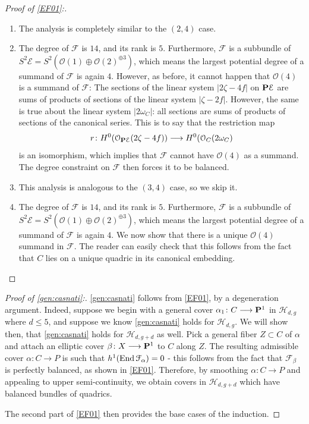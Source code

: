 \documentclass[reqno, 10 pt]{article}
\theoremstyle{definition}
\theoremstyle{remark}
\numberwithin{equation}{section}
\numberwithin{thm}{section}
\numberwithin{prop}{section}
\numberwithin{lem}{section}
\numberwithin{cor}{section}
\numberwithin{conj}{section}
\numberwithin{defn}{section}
\renewcommand{\H}{\mathcal H}
\renewcommand{\to}{\longrightarrow}
\newcommand{\cE}{{\mathcal E}}
\newcommand{\cF}{{\mathcal F}}
\newcommand{\cO}{{\mathcal O}}
\renewcommand{\P}{{\bf P}}
\newcommand {\from}{{\colon}}
\renewcommand{\H}{{\mathcal{H}}}
\newcommand {\End}{{\rm End \,}}
\begin{document}
\begin{proof}[Proof of \autoref{EF01}:]
\begin{enumerate}
\begin{enumerate}
\item[$(3,4)$:] The analysis is completely similar to the $(2,4)$ case.

\item[$(3,5)$:] The degree of $\cF$ is $14$, and its rank is $5$.  Furthermore, $\cF$ is a subbundle of $S^2 \cE = S^2 (\cO(1)  \oplus \cO(2)^{\oplus 3})$, which means the largest potential degree of a summand of $\cF$ is again $4$.  However, as before, it cannot happen that $\cO(4)$ is a summand of $\cF$: The sections of the linear system $|2\zeta - 4f|$ on $\P \cE$ are sums of products of sections of the linear system $|\zeta - 2f|$.  However, the same is true about the linear system $|2\omega_{C}|$: all sections are sums of products of sections of the canonical series.  This is to say that the restriction map \[r \from H^0(\cO_{\P \cE}(2\zeta - 4f)) \to H^{0}(\cO_{C}(2\omega_{C})\] is an isomorphism, which implies that $\cF$ cannot have $\cO(4)$ as a summand. The degree constraint on $\cF$ then forces it to be balanced.

\item[$(4,4)$:] This analysis is analogous to the $(3,4)$ case, so we skip it.

\item[$(4,5)$:] The degree of $\cF$ is $14$, and its rank is $5$.  Furthermore, $\cF$ is a subbundle of $S^2 \cE = S^2 (\cO(1)  \oplus \cO(2)^{\oplus 3})$, which means the largest potential degree of a summand of $\cF$ is again $4$. We now show that there is a unique $\cO(4)$ summand in $\cF$.  The reader can easily check that this follows from the fact that $C$ lies on a unique quadric in its canonical embedding.
\end{enumerate}
\end{enumerate}
\end{proof}

\begin{proof}[Proof of \autoref{gen:casnati}:]
\autoref{gen:casnati} follows from \autoref{EF01}, by a degeneration argument.  Indeed, suppose we begin with a general cover $\alpha_{1} \from C \to \P^1$ in $\H_{d,g}$ where $d \leq 5$, and suppose we know \autoref{gen:casnati} holds for $\H_{d,g}$. We will show then, that \autoref{gen:casnati} holds for $\H_{d,g+d}$ as well. Pick a general fiber $Z \subset C$ of $\alpha$ and attach an elliptic cover $\beta \from X \to \P^1$ to $C$ along $Z$.  The resulting admissible cover $\alpha \from C \to P$ is such that $h^1(\End \cF_{\alpha}) = 0$ - this follows from the fact that $\cF_{\beta}$ is perfectly balanced, as shown in \autoref{EF01}. Therefore, by smoothing $\alpha \from C \to P$ and appealing to upper semi-continuity, we obtain covers in $\H_{d,g+d}$ which have balanced bundles of quadrics.  

The second part of \autoref{EF01} then  provides the base cases of the induction.

\end{proof}
\end{document}
